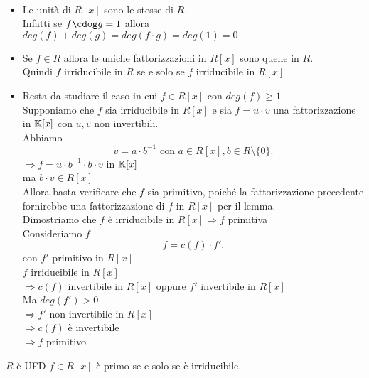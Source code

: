 \documentclass[12px]{article}
\begin{document}
\begin{dimo}\text{}\ 
	\begin{itemize}
		\item	Le unità di $R[x]$ sono le stesse di $R$. \\
			Infatti se  $f\cdog g = 1$ allora  $deg(f) + deg(g) = deg(f\cdot g) = deg (1) = 0$ 
		\item Se $f\in R$ allora le uniche fattorizzazioni in  $R[x]$  sono quelle in $R.$\\
			Quindi  $f$ irriducibile in $R$ se e solo se $f$ irriducibile in $R[x]$
		\item Resta da studiare il caso in cui  $f\in R[x]$ con  $deg(f)\geq 1$\\
			Supponiamo che  $f$ sia irriducibile in $R[x]$ e sia  $f = u\cdot v$ una fattorizzazione in  $\mathbb{K}[x]$ con  $u,v$ non invertibili. \\
			Abbiamo 
			\[
			 v = a\cdot b^{-1} \text{ con } a\in R[x], b\in R\setminus\{0\}
			.\] 
			$ \Rightarrow f = u\cdot b^{-1}\cdot b\cdot v$ in $\mathbb{K}[x]$\\
			ma  $b\cdot v\in R[x]$\\
			Allora basta verificare che  $f$ sia primitivo, poiché la fattorizzazione precedente fornirebbe una fattorizzazione di $f$ in $R[x]$ per il lemma.\\
			Dimostriamo che  $f$ è irriducibile in $R[x] \Rightarrow f$ primitiva\\
			Consideriamo $f$\\
			 \[
			f = c(f)\cdot f'
			.\] 
			con $f'$ primitivo in $R[x]$ \\
			$f$ irriducibile in $R[x]$\\
			$ \Rightarrow  c(f)$ invertibile in $R[x]$ oppure $f'$ invertibile in $R[x]$ \\
			Ma $deg(f') > 0$\\
			$ \Rightarrow f'$ non invertibile in $R[x]$\\
			 $ \Rightarrow  c(f)$ è invertibile\\
			 $ \Rightarrow f$ primitivo
	\end{itemize}
\end{dimo}
\begin{coro}
	$R$ è UFD $f\in R[x]$ è primo se e solo se è irriducibile.\\
\end{coro}
\end{document}
